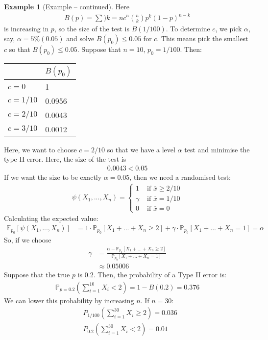 \documentclass[11pt]{scrartcl}
\theoremstyle{definition}
\newtheorem{ex}{Example}
\theoremstyle{remark}
\begin{document}
{\begin{ex}[Example -- continued] 
	Here
	\begin{align*}
		B(p) = \sum){k=nc}^n \binom{n}{k}p^k (1-p)^{n-k} 
	\end{align*}
	is increasing in $p$, so the size of the test is $B(1/100)$. To determine $c$, we pick $\alpha$, say, $\alpha = 5 \% (0.05)$ and solve $B(p_0) \leq 0.05$ for $c$. This means pick the smallest $c$ so that $B(p_0) \leq 0.05$. Suppose that $n=10$, $p_0 = 1/100$. Then: 
\begin{table}[H]
\centering 
\begin{tabular}{|l|l|}
\hline
          &  $B(p_0)$  \\ \hline
$c=0$   &  1 \\ \hline
$c=1/10$ &   0.0956 \\ \hline
$c=2/10$ &  0.0043 \\ \hline 
$c=3/10$ & 0.0012 \\ \hline 
\end{tabular}
\end{table}
\end{ex}

Here, we want to choose $c=2/10$ so that we have a level $\alpha$ test and minimise the type II error. Here, the size of the test is
\begin{align*}
	0.0043 < 0.05 
\end{align*}
If we want the size to be exactly $\alpha = 0.05$, then we need a randomised test: 
\begin{align*}
	\psi(X_1, ..., X_n) = \begin{cases}
		1 & \text{ if } \overline{x} \geq 2/10 \\
		\gamma & \text{ if } \overline{x} = 1/10 \\
		0 & \text{ if } \overline{x} = 0 
	\end{cases}
\end{align*}
Calculating the expected value: 
\begin{align*}
	\mathbb{E}_{p_0} [ \psi (X_1, ..., X_n) ] & = 1 \cdot \mathbb{P}_{p_0} [X_1 + ... + X_n \geq 2 ] + \gamma \cdot \mathbb{P}_{p_0} [X_1 + ... + X_n = 1] = \alpha 
\end{align*}
So, if we choose 
\begin{align*}
	\gamma & = \frac{\alpha - \mathbb{P}_{p_0} [X_1 + ... + X_n \geq 2]}{\mathbb{P}_{p_0} [X_1 + ... + X_n =1] } \\
		& \approx 0.05006 
\end{align*}
Suppose that the true $p$ is $0.2$. Then, the probability of a Type II error is: 
\begin{align*}
	\mathbb{P}_{p=0.2} \left( \sum_{i=1}^{10} X_i < 2 \right) = 1- B(0.2) = 0.376 
\end{align*}
We can lower this probability by increasing $n$. If $n=30$: 
\begin{align*}
	& P_{1/100} \left( \sum_{i=1}^{30} X_i \geq 2 \right) = 0.036 \\
	& P_{0.2} \left( \sum_{i=1}^{30} X_i < 2 \right) = 0.01 
\end{align*}


}
\end{document}
